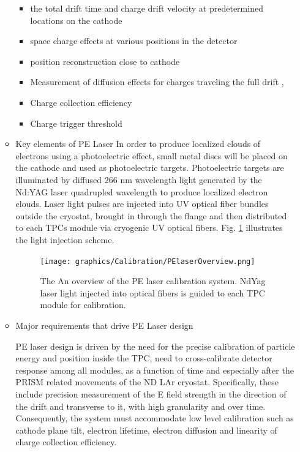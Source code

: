 \begin{itemize}
\begin{itemize}
        \begin{itemize}
        \item
    the total drift time and charge drift velocity at predetermined locations on the cathode
    \item
    space charge effects at various positions in the detector
    \item
    position reconstruction close to cathode
    \item
    Measurement of diffusion effects for charges traveling the full  drift                 ,
    \item
    Charge collection efficiency
    \item
    Charge trigger threshold
    \end{itemize}

        \item Key elements of PE Laser
        In order to produce localized clouds of electrons using a photoelectric effect, small metal discs will be placed on the cathode and used as photoelectric targets. Photoelectric targets are illuminated by diffused 266 nm wavelength light  generated by the Nd:YAG laser quadrupled wavelength to produce localized electron clouds. Laser light pulses are injected into UV optical fiber bundles outside the cryostat, brought in through the flange and then distributed to each TPCs module via cryogenic UV optical fibers. Fig. \ref{fig:PElaser_overview} illustrates the light injection scheme.
\begin{figure}[htbp]
\centering 
\texttt{[image: graphics/Calibration/PElaserOverview.png]}
\caption{\label{fig:PElaser_overview} The An overview of the PE laser calibration system. NdYag laser light injected into optical fibers is guided to each TPC module for calibration.}
\end{figure}
        \item Major requirements that drive PE Laser design
        
        PE laser design is driven by the need for the precise calibration of particle energy and position inside the TPC, need to cross-calibrate detector response among all modules, as a function of time and especially after the PRISM related movements of the ND LAr cryostat. Specifically, these include precision measurement of the E field strength in the direction of the drift and transverse to it, with high granularity and over time.  Consequently, the system must accommodate low level calibration such as cathode plane tilt, electron lifetime, electron diffusion and linearity of charge collection efficiency.


\end{itemize}
\end{itemize}
